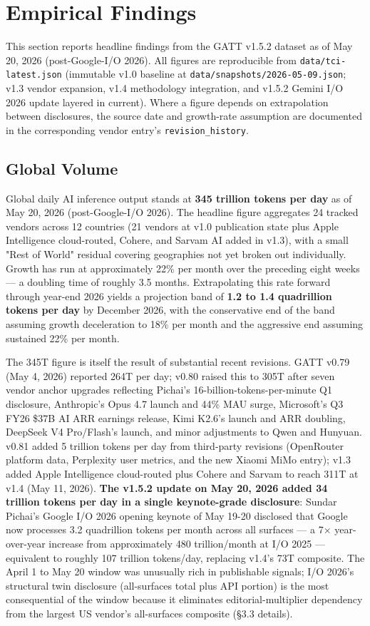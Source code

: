 \documentclass[11pt,a4paper]{article}
\begin{document}
\section{Empirical Findings}

This section reports headline findings from the GATT v1.5.2 dataset as of May 20, 2026 (post-Google-I/O 2026). All figures are reproducible from \texttt{data/tci-latest.json} (immutable v1.0 baseline at \texttt{data/snapshots/2026-05-09.json}; v1.3 vendor expansion, v1.4 methodology integration, and v1.5.2 Gemini I/O 2026 update layered in current). Where a figure depends on extrapolation between disclosures, the source date and growth-rate assumption are documented in the corresponding vendor entry's \texttt{revision\_history}.

\subsection{Global Volume}

Global daily AI inference output stands at \textbf{345 trillion tokens per day} as of May 20, 2026 (post-Google-I/O 2026). The headline figure aggregates 24 tracked vendors across 12 countries (21 vendors at v1.0 publication state plus Apple Intelligence cloud-routed, Cohere, and Sarvam AI added in v1.3), with a small "Rest of World" residual covering geographies not yet broken out individually. Growth has run at approximately 22\% per month over the preceding eight weeks --- a doubling time of roughly 3.5 months. Extrapolating this rate forward through year-end 2026 yields a projection band of \textbf{1.2 to 1.4 quadrillion tokens per day} by December 2026, with the conservative end of the band assuming growth deceleration to 18\% per month and the aggressive end assuming sustained 22\% per month.

The 345T figure is itself the result of substantial recent revisions. GATT v0.79 (May 4, 2026) reported 264T per day; v0.80 raised this to 305T after seven vendor anchor upgrades reflecting Pichai's 16-billion-tokens-per-minute Q1 disclosure, Anthropic's Opus 4.7 launch and 44\% MAU surge, Microsoft's Q3 FY26 \$37B AI ARR earnings release, Kimi K2.6's launch and ARR doubling, DeepSeek V4 Pro/Flash's launch, and minor adjustments to Qwen and Hunyuan. v0.81 added 5 trillion tokens per day from third-party revisions (OpenRouter platform data, Perplexity user metrics, and the new Xiaomi MiMo entry); v1.3 added Apple Intelligence cloud-routed plus Cohere and Sarvam to reach 311T at v1.4 (May 11, 2026). \textbf{The v1.5.2 update on May 20, 2026 added 34 trillion tokens per day in a single keynote-grade disclosure}: Sundar Pichai's Google I/O 2026 opening keynote of May 19-20 \cite{pichai2026io} disclosed that Google now processes 3.2 quadrillion tokens per month across all surfaces --- a 7× year-over-year increase from approximately 480 trillion/month at I/O 2025 --- equivalent to roughly 107 trillion tokens/day, replacing v1.4's 73T composite. The April 1 to May 20 window was unusually rich in publishable signals; I/O 2026's structural twin disclosure (all-surfaces total plus API portion) is the most consequential of the window because it eliminates editorial-multiplier dependency from the largest US vendor's all-surfaces composite (§3.3 details).
\end{document}
